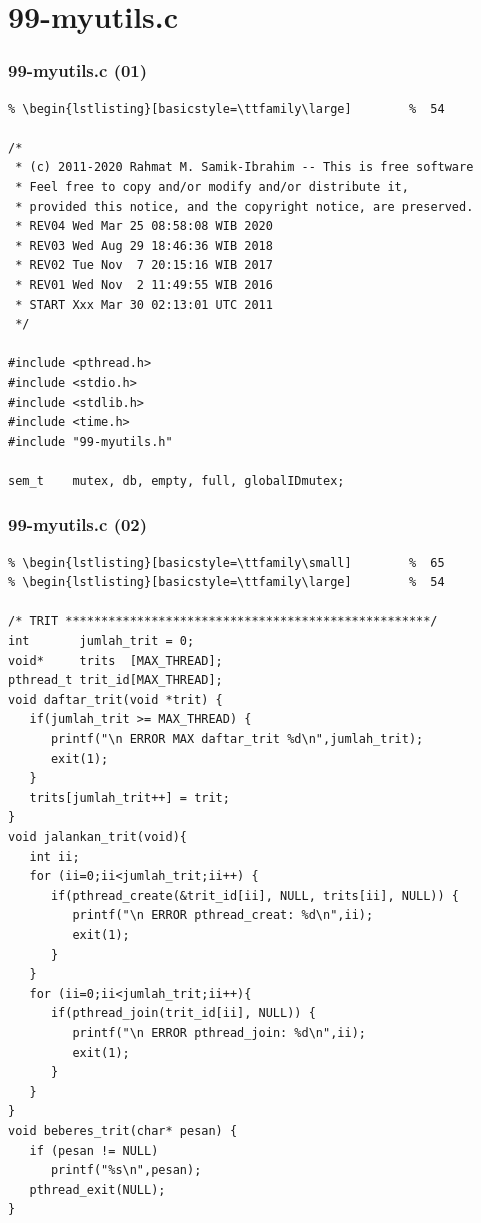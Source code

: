 \documentclass[xcolor=table, notheorems, hyperref={pdfpagelabels=false}]{beamer}
\begin{document}
\section{99-myutils.c}
\begin{frame}[fragile]
\frametitle{99-myutils.c (01)}
\begin{lstlisting}[basicstyle=\ttfamily\footnotesize] %  72
% \begin{lstlisting}[basicstyle=\ttfamily\small]        %  65
% \begin{lstlisting}[basicstyle=\ttfamily\large]        %  54

/*
 * (c) 2011-2020 Rahmat M. Samik-Ibrahim -- This is free software
 * Feel free to copy and/or modify and/or distribute it, 
 * provided this notice, and the copyright notice, are preserved. 
 * REV04 Wed Mar 25 08:58:08 WIB 2020
 * REV03 Wed Aug 29 18:46:36 WIB 2018
 * REV02 Tue Nov  7 20:15:16 WIB 2017
 * REV01 Wed Nov  2 11:49:55 WIB 2016
 * START Xxx Mar 30 02:13:01 UTC 2011
 */

#include <pthread.h>
#include <stdio.h>
#include <stdlib.h>
#include <time.h>
#include "99-myutils.h"

sem_t    mutex, db, empty, full, globalIDmutex;

\end{lstlisting}
\end{frame}

\begin{frame}[fragile]
\frametitle{99-myutils.c (02)}
\begin{lstlisting}[basicstyle=\ttfamily\tiny]         % 108
% \begin{lstlisting}[basicstyle=\ttfamily\footnotesize] %  72
% \begin{lstlisting}[basicstyle=\ttfamily\small]        %  65
% \begin{lstlisting}[basicstyle=\ttfamily\large]        %  54

/* TRIT ***************************************************/
int       jumlah_trit = 0;
void*     trits  [MAX_THREAD];
pthread_t trit_id[MAX_THREAD];
void daftar_trit(void *trit) {
   if(jumlah_trit >= MAX_THREAD) {
      printf("\n ERROR MAX daftar_trit %d\n",jumlah_trit);
      exit(1);
   }
   trits[jumlah_trit++] = trit;
}
void jalankan_trit(void){
   int ii;
   for (ii=0;ii<jumlah_trit;ii++) {
      if(pthread_create(&trit_id[ii], NULL, trits[ii], NULL)) {
         printf("\n ERROR pthread_creat: %d\n",ii);
         exit(1);
      }
   }
   for (ii=0;ii<jumlah_trit;ii++){
      if(pthread_join(trit_id[ii], NULL)) {
         printf("\n ERROR pthread_join: %d\n",ii);
         exit(1);
      }
   }
}
void beberes_trit(char* pesan) {
   if (pesan != NULL)
      printf("%s\n",pesan);
   pthread_exit(NULL);
}

\end{lstlisting}
\end{frame}
\end{document}

